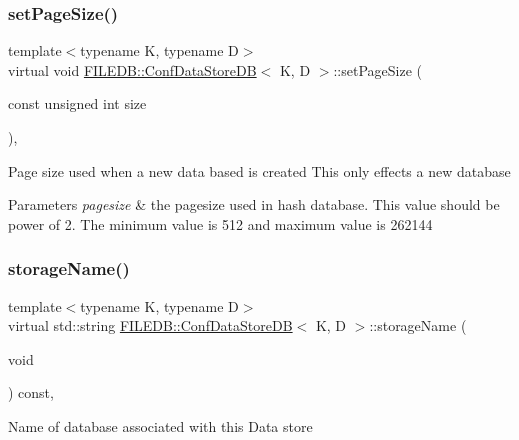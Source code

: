 \subsubsection{\texorpdfstring{setPageSize()}{setPageSize()}\hspace{0.1cm}{\footnotesize\ttfamily [3/3]}}
{\footnotesize\ttfamily template$<$typename K, typename D$>$ \\
virtual void \mbox{\hyperlink{classFILEDB_1_1ConfDataStoreDB}{F\+I\+L\+E\+D\+B\+::\+Conf\+Data\+Store\+DB}}$<$ K, D $>$\+::set\+Page\+Size (\begin{DoxyParamCaption}\item[{const unsigned int}]{size }\end{DoxyParamCaption})\hspace{0.3cm}{\ttfamily [inline]}, {\ttfamily [virtual]}}

Page size used when a new data based is created This only effects a new database


\begin{DoxyParams}{Parameters}
{\em pagesize} & the pagesize used in hash database. This value should be power of 2. The minimum value is 512 and maximum value is 262144 \\
\hline
\end{DoxyParams}
\mbox{\label{classFILEDB_1_1ConfDataStoreDB_acac74e3143398de6c5da068f37a762ee}} 
\subsubsection{\texorpdfstring{storageName()}{storageName()}\hspace{0.1cm}{\footnotesize\ttfamily [1/3]}}
{\footnotesize\ttfamily template$<$typename K, typename D$>$ \\
virtual std\+::string \mbox{\hyperlink{classFILEDB_1_1ConfDataStoreDB}{F\+I\+L\+E\+D\+B\+::\+Conf\+Data\+Store\+DB}}$<$ K, D $>$\+::storage\+Name (\begin{DoxyParamCaption}\item[{void}]{ }\end{DoxyParamCaption}) const\hspace{0.3cm}{\ttfamily [inline]}, {\ttfamily [virtual]}}

Name of database associated with this Data store

